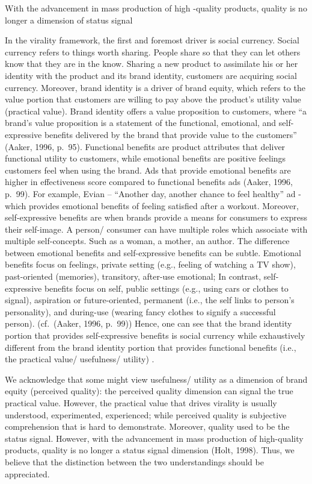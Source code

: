 \documentclass[
]{book}
\begin{document}
With the advancement in mass production of high -quality products, quality is no
longer a dimension of status signal \citep{Holt_1998}

In the virality framework, the first and foremost driver is social currency.
Social currency refers to things worth sharing. People share so that they can
let others know that they are in the know. Sharing a new product to assimilate
his or her identity with the product and its brand identity, customers are
acquiring social currency. Moreover, brand identity is a driver of brand equity,
which refers to the value portion that customers are willing to pay above the
product's utility value (practical value). Brand identity offers a value
proposition to customers, where ``a brand's value proposition is a statement of
the functional, emotional, and self-expressive benefits delivered by the brand
that provide value to the customers'' (Aaker, 1996, p.~95). Functional benefits
are product attributes that deliver functional utility to customers, while
emotional benefits are positive feelings customers feel when using the brand.
Ads that provide emotional benefits are higher in effectiveness score compared
to functional benefits ads (Aaker, 1996, p.~99). For example, Evian -- ``Another
day, another chance to feel healthy'' ad - which provides emotional benefits of
feeling satisfied after a workout. Moreover, self-expressive benefits are when
brands provide a means for consumers to express their self-image. A person/
consumer can have multiple roles which associate with multiple self-concepts.
Such as a woman, a mother, an author. The difference between emotional benefits
and self-expressive benefits can be subtle. Emotional benefits focus on
feelings, private setting (e.g., feeling of watching a TV show), past-oriented
(memories), transitory, after-use emotional; In contrast, self-expressive
benefits focus on self, public settings (e.g., using cars or clothes to signal),
aspiration or future-oriented, permanent (i.e., the self links to person's
personality), and during-use (wearing fancy clothes to signify a successful
person). (cf.~(Aaker, 1996, p.~99)) Hence, one can see that the brand identity
portion that provides self-expressive benefits is social currency while
exhaustively different from the brand identity portion that provides functional
benefits (i.e., the practical value/ usefulness/ utility) .

We acknowledge that some might view usefulness/ utility as a dimension of brand
equity (perceived quality): the perceived quality dimension can signal the true
practical value. However, the practical value that drives virality is usually
understood, experimented, experienced; while perceived quality is subjective
comprehension that is hard to demonstrate. Moreover, quality used to be the
status signal. However, with the advancement in mass production of high-quality
products, quality is no longer a status signal dimension (Holt, 1998). Thus, we
believe that the distinction between the two understandings should be
appreciated.
\end{document}
